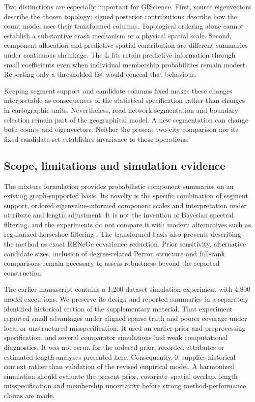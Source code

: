 \documentclass[11pt]{article}
\begin{document}
Two distinctions are especially important for GIScience. First, source eigenvectors describe the chosen topology; signed posterior contributions describe how the count model uses their transformed columns. Topological ordering alone cannot establish a substantive crash mechanism or a physical spatial scale. Second, component allocation and predictive spatial contribution are different summaries under continuous shrinkage. The L fits retain predictive information through small coefficients even when individual membership probabilities remain modest. Reporting only a thresholded list would conceal that behaviour.

Keeping segment support and candidate columns fixed makes these changes interpretable as consequences of the statistical specification rather than changes in cartographic units. Nevertheless, road-network segmentation and boundary selection remain part of the geographical model. A new segmentation can change both counts and eigenvectors. Neither the present two-city comparison nor its fixed candidate set establishes invariance to those operations.

\subsection{Scope, limitations and simulation evidence}
The mixture formulation provides probabilistic component summaries on an existing graph-supported basis. Its novelty is the specific combination of segment support, ordered eigenvalue-informed component scales and interpretation under attribute and length adjustment. It is not the invention of Bayesian spectral filtering, and the experiments do not compare it with modern alternatives such as regularized-horseshoe filtering \citep{donegan2020}. The transformed basis also prevents describing the method as exact RENeGe covariance reduction. Prior sensitivity, alternative candidate sizes, inclusion of degree-related Perron structure and full-rank comparisons remain necessary to assess robustness beyond the reported construction.

The earlier manuscript contains a 1,200-dataset simulation experiment with 4,800 model executions. We preserve its design and reported summaries in a separately identified historical section of the supplementary material. That experiment reported small advantages under aligned sparse truth and poorer coverage under local or unstructured misspecification. It used an earlier prior and preprocessing specification, and several comparator simulations had weak computational diagnostics. It was not rerun for the ordered prior, recorded attributes or estimated-length analyses presented here. Consequently, it supplies historical context rather than validation of the revised empirical model. A harmonized simulation should evaluate the present prior, covariate--spatial overlap, length misspecification and membership uncertainty before strong method-performance claims are made.
\end{document}
